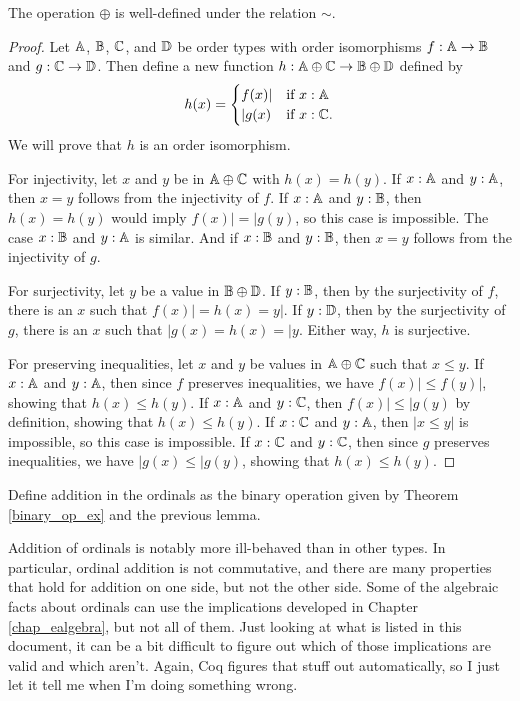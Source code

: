 \documentclass[../../math.tex]{subfiles}
\begin{document}
\begin{lemma}
    The operation $\oplus$ is well-defined under the relation $\sim$.
\end{lemma}
\begin{proof}
    Let $\mathbb{A}$, $\mathbb{B}$, $\mathbb{C}$, and $\mathbb{D}$ be order types with order isomorphisms $f :
    \mathbb{A} \to \mathbb{B}$ and $g : \mathbb{C} \to \mathbb{D}$.  Then define a new function $h : \mathbb{A} \oplus
    \mathbb{C} \to \mathbb{B} \oplus \mathbb{D}$ defined by
    \[
        h(x) =
        \begin{cases}
            f(x)| &\text{if $x : \mathbb{A}$} \\
            |g(x) &\text{if $x : \mathbb{C}$.}
        \end{cases}
    \]
    We will prove that $h$ is an order isomorphism.

    For injectivity, let $x$ and $y$ be in $\mathbb{A} \oplus \mathbb{C}$ with $h(x) = h(y)$.
    If $x : \mathbb{A}$ and $y : \mathbb{A}$, then $x = y$ follows from the injectivity of $f$.
    If $x : \mathbb{A}$ and $y : \mathbb{B}$, then $h(x) = h(y)$ would imply $f(x)| = |g(y)$, so
    this case is impossible.  The case $x : \mathbb{B}$ and $y : \mathbb{A}$ is similar.  And if
    $x : \mathbb{B}$ and $y : \mathbb{B}$, then $x = y$ follows from the injectivity of $g$.

    For surjectivity, let $y$ be a value in $\mathbb{B} \oplus \mathbb{D}$.  If $y : \mathbb{B}$, then
    by the surjectivity of $f$, there is an $x$ such that $f(x)| = h(x) = y|$.
    If $y : \mathbb{D}$, then by the surjectivity of $g$, there is an $x$ such that
    $|g(x) = h(x) = |y$.  Either way, $h$ is surjective.

    For preserving inequalities, let $x$ and $y$ be values in $\mathbb{A} \oplus \mathbb{C}$
    such that $x \leq y$.  If $x : \mathbb{A}$ and $y : \mathbb{A}$, then since $f$ preserves
    inequalities, we have $f(x)| \leq f(y)|$, showing that $h(x) \leq h(y)$.  If
    $x : \mathbb{A}$ and $y : \mathbb{C}$, then $f(x)| \leq |g(y)$ by definition, showing that
    $h(x) \leq h(y)$.  If $x : \mathbb{C}$ and $y : \mathbb{A}$, then $|x \leq y|$ is
    impossible, so this case is impossible.  If $x : \mathbb{C}$ and $y : \mathbb{C}$, then
    since $g$ preserves inequalities, we have $|g(x) \leq |g(y)$, showing that
    $h(x) \leq h(y)$.
\end{proof}

\begin{instance}
    Define addition in the ordinals as the binary operation given by Theorem
    \ref{binary_op_ex} and the previous lemma.
\end{instance}

Addition of ordinals is notably more ill-behaved than in other types.  In
particular, ordinal addition is not commutative, and there are many properties
that hold for addition on one side, but not the other side.  Some of the
algebraic facts about ordinals can use the implications developed in Chapter
\ref{chap_ealgebra}, but not all of them.  Just looking at what is listed in
this document, it can be a bit difficult to figure out which of those
implications are valid and which aren't.  Again, Coq figures that stuff out
automatically, so I just let it tell me when I'm doing something wrong.
\end{document}
